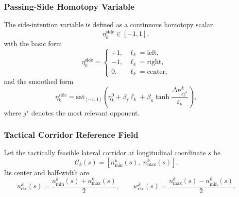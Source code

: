 \documentclass[final ,3p, times]{elsarticle}
\begin{document}
\subsubsection{Passing-Side Homotopy Variable}

The side-intention variable is defined as a continuous homotopy scalar
\begin{equation}
\eta_k^{\mathrm{side}} \in [-1,1],
\label{eq:eta_side_range}
\end{equation}
with the basic form
\begin{equation}
\eta_k^{\mathrm{side}}
=
\begin{cases}
+1, & \ell_k=\mathrm{left},\\
-1, & \ell_k=\mathrm{right},\\
0, & \ell_k=\mathrm{center},
\end{cases}
\label{eq:eta_side_discrete}
\end{equation}
and the smoothed form
\begin{equation}
\eta_k^{\mathrm{side}}
=
\mathrm{sat}_{[-1,1]}
\left(
\eta_k^{0}
+
\beta_\ell \ell_k
+
\beta_n \tanh\!\frac{\Delta n_{ej^\star}^k}{\varepsilon_n}
\right),
\label{eq:eta_side_smooth}
\end{equation}
where $j^\star$ denotes the most relevant opponent.

\subsubsection{Tactical Corridor Reference Field}

Let the tactically feasible lateral corridor at longitudinal coordinate $s$ be
\begin{equation}
\mathcal{C}_k(s)
=
\left[
n_{\min}^k(s),\;
n_{\max}^k(s)
\right].
\label{eq:tactical_corridor_interval_repeated}
\end{equation}
Its center and half-width are
\begin{equation}
n_{\mathrm{ctr}}^k(s)
=
\frac{n_{\min}^k(s)+n_{\max}^k(s)}{2},
\qquad
w_{\mathrm{ctr}}^k(s)
=
\frac{n_{\max}^k(s)-n_{\min}^k(s)}{2}.
\label{eq:corridor_center_halfwidth}
\end{equation}
\end{document}
